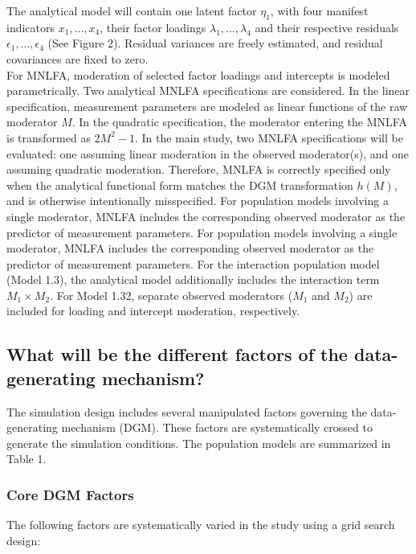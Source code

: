 \documentclass[
  man,
  floatsintext]{apa7}
\begin{document}
The analytical model will contain one latent factor \(\eta_1\), with
four manifest indicators \({x_1,..., x_4}\), their factor loadings
\({\lambda_1,..., \lambda_4}\) and their respective residuals
\({\epsilon_1,..., \epsilon_4}\) (See Figure 2). Residual variances are
freely estimated, and residual covariances are fixed to zero.\\
For MNLFA, moderation of selected factor loadings and intercepts is
modeled parametrically. Two analytical MNLFA specifications are
considered. In the linear specification, measurement parameters are
modeled as linear functions of the raw moderator \(M\). In the quadratic
specification, the moderator entering the MNLFA is transformed as
\(2M^2-1\). In the main study, two MNLFA specifications will be
evaluated: one assuming linear moderation in the observed moderator(s),
and one assuming quadratic moderation. Therefore, MNLFA is correctly
specified only when the analytical functional form matches the DGM
transformation \(h(M)\), and is otherwise intentionally misspecified.
For population models involving a single moderator, MNLFA includes the
corresponding observed moderator as the predictor of measurement
parameters. For population models involving a single moderator, MNLFA
includes the corresponding observed moderator as the predictor of
measurement parameters. For the interaction population model (Model
1.3), the analytical model additionally includes the interaction term
\(M_1 \times M_2\). For Model 1.32, separate observed moderators
(\(M_1\) and \(M_2\)) are included for loading and intercept moderation,
respectively.

\subsection{What will be the different factors of the data-generating
mechanism?}\label{what-will-be-the-different-factors-of-the-data-generating-mechanism}

The simulation design includes several manipulated factors governing the
data-generating mechanism (DGM). These factors are systematically
crossed to generate the simulation conditions. The population models are
summarized in Table 1.

\subsubsection{Core DGM Factors}\label{core-dgm-factors}

The following factors are systematically varied in the study using a
grid search design:
\end{document}
